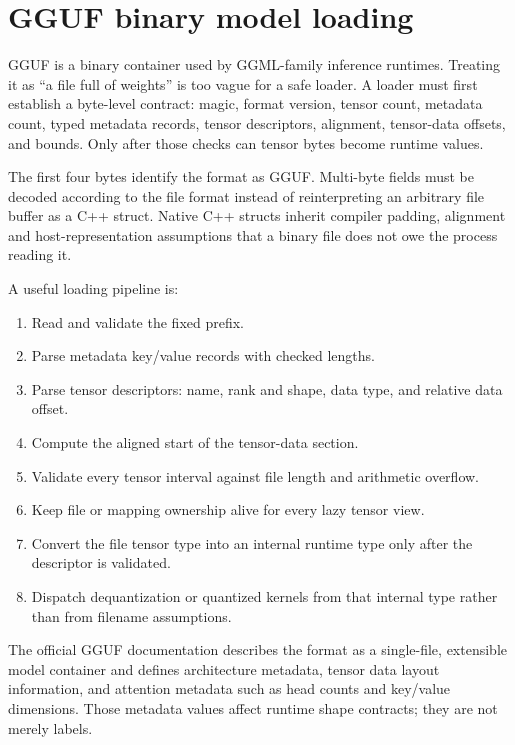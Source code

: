 \hypertarget{appendix-fef72dd246f2}{}\label{referencestart:appendix-fef72dd246f2}
\section{GGUF binary model loading}\label{appendix-fef72dd246f2-gguf-binary-model-loading}

GGUF is a binary container used by GGML-family inference runtimes. Treating it as ``a file full of weights'' is too vague for a safe loader. A loader must first establish a byte-level contract: magic, format version, tensor count, metadata count, typed metadata records, tensor descriptors, alignment, tensor-data offsets, and bounds. Only after those checks can tensor bytes become runtime values.

The first four bytes identify the format as GGUF. Multi-byte fields must be decoded according to the file format instead of reinterpreting an arbitrary file buffer as a C++ struct. Native C++ structs inherit compiler padding, alignment and host-representation assumptions that a binary file does not owe the process reading it.

A useful loading pipeline is:

\begin{enumerate}
\def\labelenumi{\arabic{enumi}.}
\tightlist
\item
  Read and validate the fixed prefix.
\item
  Parse metadata key/value records with checked lengths.
\item
  Parse tensor descriptors: name, rank and shape, data type, and relative data offset.
\item
  Compute the aligned start of the tensor-data section.
\item
  Validate every tensor interval against file length and arithmetic overflow.
\item
  Keep file or mapping ownership alive for every lazy tensor view.
\item
  Convert the file tensor type into an internal runtime type only after the descriptor is validated.
\item
  Dispatch dequantization or quantized kernels from that internal type rather than from filename assumptions.
\end{enumerate}

The official GGUF documentation describes the format as a single-file, extensible model container and defines architecture metadata, tensor data layout information, and attention metadata such as head counts and key/value dimensions. Those metadata values affect runtime shape contracts; they are not merely labels.

